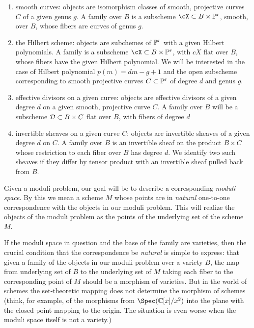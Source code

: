 \begin{enumerate}
\item  smooth curves: objects are isomorphism classes  of smooth, projective curves $C$ of a given genus $g$. A family over $B$ is a subscheme $\cX \subset B \times \PP^r$, smooth, over $B$, whose fibers are curves of genus $g$.

\item the Hilbert scheme: objects are subchemes of $ \PP^r$ with a given Hilbert polynomials. A family  is a subscheme $\cX \subset B \times \PP^r$, with $cX$ flat over $B$, whose fibers have the given Hilbert polynomial. We will be interested in the case of Hilbert polynomial $p(m) = dm-g+1$ and the open subscheme corresponding to smooth projective curves $C \subset \PP^r$ of degree $d$ and genus $g$.

\item effective divisors on a given curve: objects are effective divisors of a given degree $d$ on a given smooth, projective curve $C$. A family over $B$ will be a subscheme $\cD \subset B \times C$ flat over $B$, with fibers of degree $d$

\item invertible sheaves on a given curve $C$: objects are invertible sheaves of a given degree $d$ on $C$. A family over $B$ is an invertible sheaf on the product $B \times C$ whose restriction to each fiber over $B$ has degree $d$. We identify two such sheaves if they differ by tensor product with an invertible sheaf pulled back from $B$.
\end{enumerate}

Given a moduli problem, our goal will be to describe a corresponding \emph{moduli space}. By this we mean a scheme $M$ whose points are in \emph{natural} one-to-one correspondence with the objects in our moduli problem. This will realize the objects of the moduli problem as the points of the underlying set of the scheme $M$.

If the moduli space in question and the base of the family are varieties, then the crucial condition that the correspondence be \emph{natural} is simple to express: that given a family of the objects in our moduli problem over a variety $B$, the map from underlying set of $B$ to the underlying set of $M$ taking each fiber
to the corresponding point of $M$ should be a morphism of varieties.  But in the world of schemes the set-theoretic mapping does not determine the morphism of schemes (think, for example, of the morphisms from $\Spec(\CC[x]/x^{2})$ into the plane with the closed point mapping to the origin. The situation is even worse when the moduli space itself is not a variety.)

